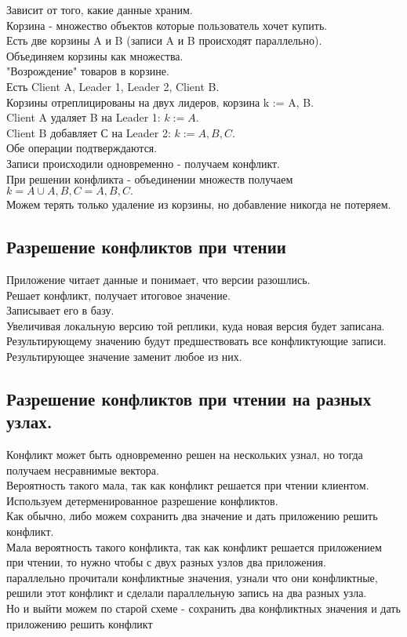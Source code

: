 Зависит от того, какие данные храним.\\
Корзина - множество объектов которые пользователь хочет купить.\\
Есть две корзины A и B (записи A и B происходят параллельно).\\
Объединяем корзины как множества.\\
"Возрождение" товаров в корзине.\\
Есть Client A, Leader 1, Leader 2, Client B.\\
Корзины отреплицированы на двух лидеров, корзина k := {A, B}.\\
Client A удаляет B на Leader 1: $k := {A}$.\\
Client B добавляет С на Leader 2: $k := {A, B, C}$.\\
Обе операции подтверждаются.\\
Записи происходили одновременно - получаем конфликт.\\
При решении конфликта - объединении множеств получаем $k = {A} \cup {A, B, C} = {A, B, C}.$\\
Можем терять только удаление из корзины, но добавление никогда не потеряем.\\
\subsection{Разрешение конфликтов при чтении}
Приложение читает данные и понимает, что версии разошлись.\\
Решает конфликт, получает итоговое значение.\\
Записывает его в базу.\\
Увеличивая локальную версию той реплики, куда новая версия будет записана.\\
Результирующему значению будут предшествовать все конфликтующие записи.\\
Результирующее значение заменит любое из них.\\
\subsection{Разрешение конфликтов при чтении на разных узлах.}
Конфликт может быть одновременно решен на нескольких узнал, но тогда получаем несравнимые вектора.\\
Вероятность такого мала, так как конфликт решается при чтении клиентом.\\
Используем детерменированное разрешение конфликтов.\\
Как обычно, либо можем сохранить два значение и дать приложению решить конфликт.\\
Мала вероятность такого конфликта, так как конфликт решается приложением при чтении, то нужно чтобы с двух разных узлов два приложения.\\ параллельно прочитали конфликтные значения, узнали что они конфликтные, решили этот конфликт и сделали параллельную запись на два разных узла.\\
Но и выйти можем по старой схеме - сохранить два конфликтных значения и дать приложению решить конфликт
